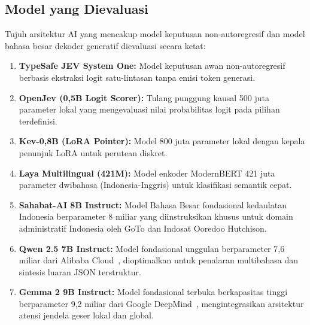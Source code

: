 \documentclass[journal,compsoc]{IEEEtran}
\begin{document}
\subsection{Model yang Dievaluasi}
Tujuh arsitektur AI yang mencakup model keputusan non-autoregresif dan model bahasa besar dekoder generatif dievaluasi secara ketat:
\begin{enumerate}
    \item \textbf{TypeSafe JEV System One:} Model keputusan awan non-autoregresif berbasis ekstraksi logit satu-lintasan tanpa emisi token generasi.
    \item \textbf{OpenJev (0,5B Logit Scorer):} Tulang punggung kausal 500 juta parameter lokal yang mengevaluasi nilai probabilitas logit pada pilihan terdefinisi.
    \item \textbf{Kev-0,8B (LoRA Pointer):} Model 800 juta parameter lokal dengan kepala penunjuk LoRA untuk perutean diskret.
    \item \textbf{Laya Multilingual (421M):} Model enkoder ModernBERT 421 juta parameter dwibahasa (Indonesia-Inggris) untuk klasifikasi semantik cepat.
    \item \textbf{Sahabat-AI 8B Instruct:} Model Bahasa Besar fondasional kedaulatan Indonesia berparameter 8 miliar yang diinstruksikan khusus untuk domain administratif Indonesia oleh GoTo dan Indosat Ooredoo Hutchison.
    \item \textbf{Qwen 2.5 7B Instruct:} Model fondasional unggulan berparameter 7,6 miliar dari Alibaba Cloud~\cite{qwen2024}, dioptimalkan untuk penalaran multibahasa dan sintesis luaran JSON terstruktur.
    \item \textbf{Gemma 2 9B Instruct:} Model fondasional terbuka berkapasitas tinggi berparameter 9,2 miliar dari Google DeepMind~\cite{gemma2024}, mengintegrasikan arsitektur atensi jendela geser lokal dan global.
\end{enumerate}
\end{document}
